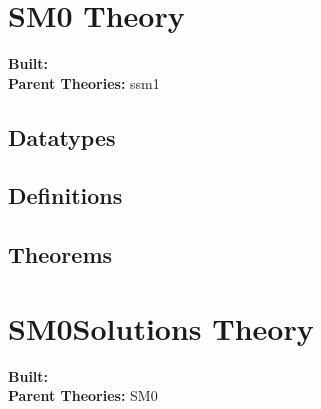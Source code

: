 \documentclass[11pt, twoside]{article}
\begin{document}



\tableofcontents
\cleardoublepage
\HOLpagestyle

\section{SM0 Theory}
\begin{flushleft}
\textbf{Built:} \HOLSMZeroDate \\[2pt]
\textbf{Parent Theories:} ssm1
\end{flushleft}

\subsection{Datatypes}

\HOLSMZeroDatatypes

\subsection{Definitions}

\HOLSMZeroDefinitions

\subsection{Theorems}

\HOLSMZeroTheorems

\section{SM0Solutions Theory}
\begin{flushleft}
\textbf{Built:} \HOLSMZeroSolutionsDate \\[2pt]
\textbf{Parent Theories:} SM0
\end{flushleft}
\end{document}
